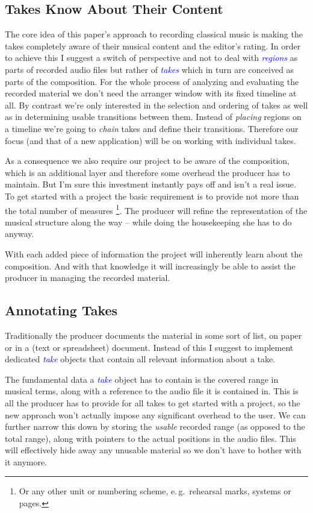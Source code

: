 \documentclass[11pt,a4paper]{article}
\newcommand*{\term}[1]{\textcolor{blue}{\emph{#1}}}
\begin{document}
\subsection{Takes Know About Their Content}

The core idea of this paper's approach to recording classical music is making
the takes completely aware of their musical content and the editor's rating.
In order to achieve this I suggest a switch of perspective and not to deal with
\term{regions} as parts of recorded audio files but rather of \term{takes} which
in turn are conceived as parts of the composition.
For the whole process of analyzing and evaluating the recorded material we don't
need the arranger window with its fixed timeline at all.
By contrast we're only interested in the selection and ordering of takes as well
as in determining usable transitions between them.
Instead of \emph{placing} regions on a timeline we're going to \emph{chain}
takes and define their transitions.
Therefore our focus (and that of a new application) will be on working with
individual takes.

As a consequence we also require our project to be aware of the composition,
which is an additional layer and therefore some overhead the producer has to
maintain.
But I'm sure this investment instantly pays off and isn't a real issue.
To get started with a project the basic requirement is to provide not more than
the total number of measures%
\footnote{Or any other unit or numbering scheme, e.\,g.\ rehearsal marks,
systems or pages.}.
The producer will refine the representation of the musical structure along the
way -- while doing the housekeeping she has to do anyway.

With each added piece of information the project will inherently learn about the
composition.
And with that knowledge it will increasingly be able to assist the producer in
managing the recorded material.

\subsection{Annotating Takes}
Traditionally the producer documents the material in some sort of list, on paper
or in a (text or spreadsheet) document.
Instead of this I suggest to implement dedicated \term{take} objects that
contain all relevant information about a take.

The fundamental data a \term{take} object has to contain is the covered range in
musical terms, along with a reference to the audio file it is contained in.
This is all the producer has to provide for all takes to get started with a
project, so the new approach won't actually impose any significant overhead to
the user.
We can further narrow this down by storing the \emph{usable} recorded range (as
opposed to the total range), along with pointers to the actual positions in the
audio files.
This will effectively hide away any unusable material so we don't have to bother
with it anymore.
\end{document}
